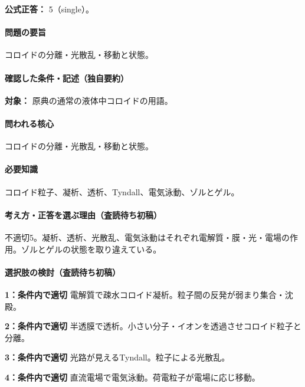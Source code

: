\textbf{公式正答：} 5（single）。

\paragraph{問題の要旨} コロイドの分離・光散乱・移動と状態。

\paragraph{確認した条件・記述（独自要約）}\mbox{}\par

\noindent\textbf{対象：} 原典の通常の液体中コロイドの用語。\par

\paragraph{問われる核心} コロイドの分離・光散乱・移動と状態。

\paragraph{必要知識} コロイド粒子、凝析、透析、Tyndall、電気泳動、ゾルとゲル。

\paragraph{考え方・正答を選ぶ理由（査読待ち初稿）} 不適切5。凝析、透析、光散乱、電気泳動はそれぞれ電解質・膜・光・電場の作用。ゾルとゲルの状態を取り違えている。

\paragraph{選択肢の検討（査読待ち初稿）}\mbox{}\par

\noindent\textbf{1：条件内で適切} 電解質で疎水コロイド凝析。粒子間の反発が弱まり集合・沈殿。\par

\noindent\textbf{2：条件内で適切} 半透膜で透析。小さい分子・イオンを透過させコロイド粒子と分離。\par

\noindent\textbf{3：条件内で適切} 光路が見えるTyndall。粒子による光散乱。\par

\noindent\textbf{4：条件内で適切} 直流電場で電気泳動。荷電粒子が電場に応じ移動。\par

